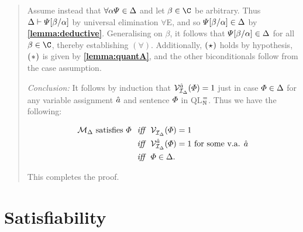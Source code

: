 \begin{quote}
  Assume instead that $\forall \alpha\varPsi\in\Delta$ and let $\beta\in\C$ be arbitrary.
  Thus $\Delta\vdash\varPsi[\beta/\alpha]$ by universal elimination $\forall$E, and so $\varPsi[\beta/\alpha]\in\Delta$ by \textbf{\ref{lemma:deductive}}.
  Generalising on $\beta$, it follows that $\varPsi[\beta/\alpha]\in\Delta$ for all $\beta\in\C$, thereby establishing $(\forall)$.
  Additionally, $(\hspace{.7pt}\star\hspace{.7pt})$ holds by hypothesis, $(\hspace{.7pt}\ast\hspace{.7pt})$ is given by \textbf{\ref{lemma:quantA}}, and the other biconditionals follow from the case assumption.

  \textit{Conclusion:}
  It follows by induction that $\mathcal{V}_{\mathcal{I}_\Delta}^{\hat{a}}(\varPhi)=1$ just in case $\varPhi\in\Delta$ for any variable assignment $\hat{a}$ and sentence $\varPhi$ in QL$^=_{\mathbb{N}}$. 
  Thus we have the following:

  \vspace{-.2in}
  \begin{align*}
    \mathcal{M}_\Delta \text{ satisfies } \varPhi &\textit{ ~iff~ } \mathcal{V}_{\mathcal{I}_\Delta}^{}(\varPhi)=1\\
    &\textit{ ~iff~ } \mathcal{V}_{\mathcal{I}_\Delta}^{\hat{a}}(\varPhi)=1 \text{ for some v.a. } \hat{a}\\
      &\textit{ ~iff~ } \varPhi\in\Delta.
  \end{align*}

  This completes the proof.
\end{quote}





\section{Satisfiability}%
  \label{sub:Satisfiability}
 
